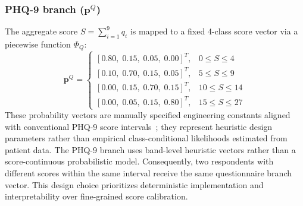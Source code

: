 \documentclass[10pt, conference, letterpaper]{IEEEtran}
\begin{document}
\subsubsection{PHQ-9 branch ($\mathbf{p}^Q$)}
The aggregate score $S = \sum_{i=1}^{9} q_i$ is mapped to a fixed 4-class
score vector via a piecewise function $\Phi_Q$:
\begin{equation}
  \mathbf{p}^Q =
  \begin{cases}
    [0.80,\;0.15,\;0.05,\;0.00]^T, & 0  \le S \le 4  \\
    [0.10,\;0.70,\;0.15,\;0.05]^T, & 5  \le S \le 9  \\
    [0.00,\;0.15,\;0.70,\;0.15]^T, & 10 \le S \le 14 \\
    [0.00,\;0.05,\;0.15,\;0.80]^T, & 15 \le S \le 27
  \end{cases}
  \label{eq:phq_probs}
\end{equation}
These probability vectors are manually specified engineering constants aligned
with conventional PHQ-9 score intervals~\cite{kroenke2001}; they represent heuristic design
parameters rather than empirical class-conditional likelihoods estimated from
patient data.
The PHQ-9 branch uses band-level heuristic vectors rather than a
score-continuous probabilistic model. Consequently, two respondents with
different scores within the same interval receive the same questionnaire
branch vector. This design choice prioritizes deterministic implementation
and interpretability over fine-grained score calibration.
\end{document}

